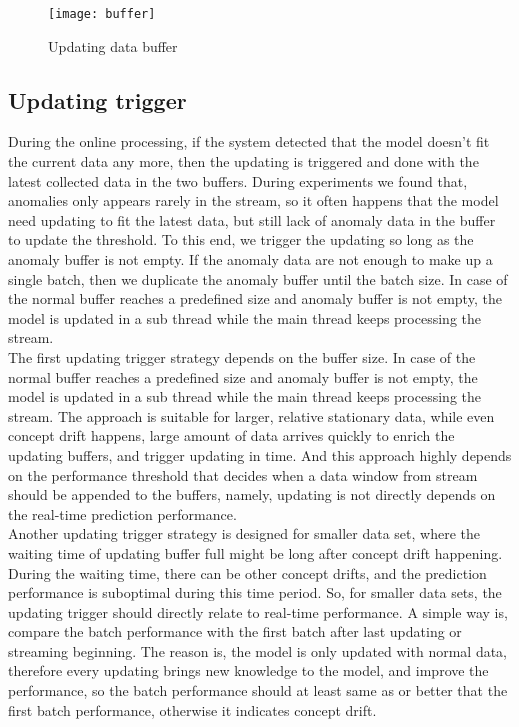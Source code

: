 \begin{figure}[h]
\centering
\texttt{[image: buffer]}
\caption[Updating data buffer]{Updating data buffer}
\label{fig:buffer}
\end{figure}


\subsection{Updating trigger}
\label{trigger}

During the online processing, if the system detected that the model doesn’t fit the current data any more, then the updating is triggered and done with the latest collected data in the two buffers. During experiments we found that, anomalies only appears rarely in the stream, so it often happens that the model need updating to fit the latest data, but still lack of anomaly data in the buffer to update the threshold. To this end, we trigger the updating so long as the anomaly buffer is not empty. If the anomaly data are not enough to make up a single batch, then we duplicate the anomaly buffer until the batch size. In case of the normal buffer reaches a predefined size and anomaly buffer is not empty, the model is updated in a sub thread while the main thread keeps processing the stream.\\
The first updating trigger strategy depends on the buffer size. In case of the normal buffer reaches a predefined size and anomaly buffer is not empty, the model is updated in a sub thread while the main thread keeps processing the stream. The approach is suitable for larger, relative stationary data, while even concept drift happens, large amount of data arrives quickly to enrich the updating buffers, and trigger updating in time. And this approach highly depends on the performance threshold that decides when a data window from stream should be appended to the buffers, namely, updating is not directly depends on the real-time prediction performance. \\
Another updating trigger strategy is designed for smaller data set, where the waiting time of updating buffer full might be long after concept drift happening. During the waiting time, there can be other concept drifts, and the prediction performance is suboptimal during this time period. So, for smaller data sets, the updating trigger should directly relate to real-time performance. A simple way is, compare the batch performance with the first batch after last updating or streaming beginning. The reason is, the model is only updated with normal data, therefore every updating brings new knowledge to the model, and improve the performance, so the batch performance should at least same as or better that the first batch performance, otherwise it indicates concept drift.\\


